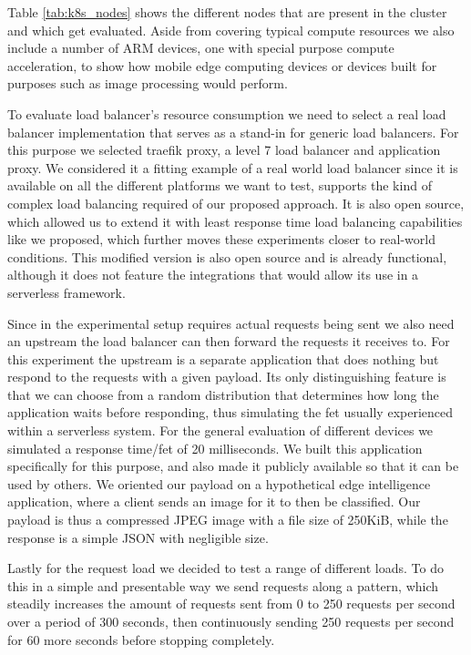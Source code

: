 \documentclass[draft,final]{vutinfth} %
\begin{document}
Table \ref{tab:k8s_nodes} shows the different nodes that are present in the cluster and which get evaluated. Aside from covering typical compute resources we also include a number of ARM devices, one with special purpose compute acceleration, to show how mobile edge computing devices or devices built for purposes such as image processing would perform.

To evaluate load balancer's resource consumption we need to select a real load balancer implementation that serves as a stand-in for generic load balancers.
For this purpose we selected traefik proxy\cite{traefik}, a level 7 load balancer and application proxy.
We considered it a fitting example of a real world load balancer since it is available on all the different platforms we want to test, supports the kind of complex load balancing required of our proposed approach.
It is also open source, which allowed us to extend it with least response time load balancing capabilities like we proposed, which further moves these experiments closer to real-world conditions.
This modified version\cite{traefik-jjnp} is also open source and is already functional, although it does not feature the integrations that would allow its use in a serverless framework.

Since in the experimental setup requires actual requests being sent we also need an upstream the load balancer can then forward the requests it receives to.
For this experiment the upstream is a separate application that does nothing but respond to the requests with a given payload.
Its only distinguishing feature is that we can choose from a random distribution that determines how long the application waits before responding, thus simulating the \gls{fet} usually experienced within a serverless system.
For the general evaluation of different devices we simulated a response time/\gls{fet} of 20 milliseconds.
We built this application specifically for this purpose, and also made it publicly available\cite{palecekResponder2021} so that it can be used by others.
We oriented our payload on a hypothetical edge intelligence application, where a client sends an image for it to then be classified.
Our payload is thus a compressed JPEG image with a file size of 250KiB, while the response is a simple JSON with negligible size.

Lastly for the request load we decided to test a range of different loads.
To do this in a simple and presentable way we send requests along a pattern, which steadily increases the amount of requests sent from 0 to 250 requests per second over a period of 300 seconds, then continuously sending 250 requests per second for 60 more seconds before stopping completely.
\end{document}
